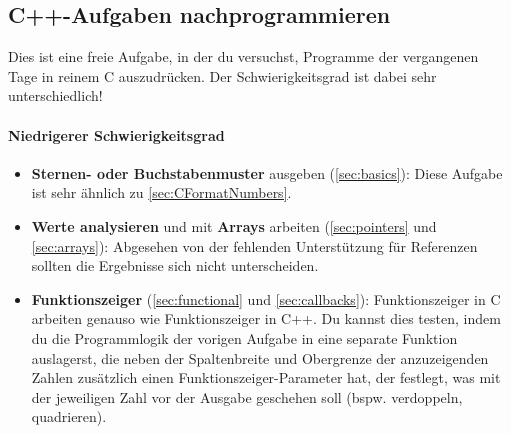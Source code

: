 
\subsection{C++-Aufgaben nachprogrammieren \optional}

\optionaltextboxC

Dies ist eine freie Aufgabe, in der du versuchst, Programme der vergangenen Tage in reinem C auszudrücken.
Der Schwierigkeitsgrad ist dabei sehr unterschiedlich!

\paragraph{Niedrigerer Schwierigkeitsgrad}
\begin{itemize}
\item
\textbf{Sternen- oder Buchstabenmuster} ausgeben (\ref{sec:basics}):
Diese Aufgabe ist sehr ähnlich zu \ref{sec:CFormatNumbers}.

\item
\textbf{Werte analysieren} und mit \textbf{Arrays} arbeiten (\ref{sec:pointers} und \ref{sec:arrays}):
Abgesehen von der fehlenden Unterstützung für Referenzen sollten die Ergebnisse sich nicht unterscheiden.

\item
\textbf{Funktionszeiger} (\ref{sec:functional} und \ref{sec:callbacks}):
Funktionszeiger in C arbeiten genauso wie Funktionszeiger in C++.
Du kannst dies testen, indem du die Programmlogik der vorigen Aufgabe in eine separate Funktion auslagerst, die neben der Spaltenbreite und Obergrenze der anzuzeigenden Zahlen zusätzlich einen Funktionszeiger-Parameter hat, der festlegt, was mit der jeweiligen Zahl vor der Ausgabe geschehen soll (bspw. verdoppeln, quadrieren).
\end{itemize}

